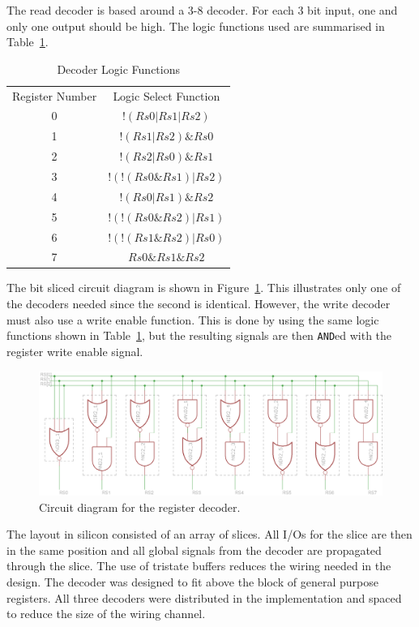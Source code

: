 The read decoder is based around a 3-8 decoder. 
For each 3 bit input, one and only one output should be high. 
The logic functions used are summarised in Table~\ref{tab:reg:decoder}.

\begin{table}
\centering
\begin{tabular}{cc}
Register Number & Logic Select Function \\
0		&		$!( Rs0 | Rs1 | Rs2 )$ \\
1		&		$ !( Rs1 | Rs2 ) \& Rs0$	\\
2		&		$!( Rs2 | Rs0 ) \& Rs1$\\
3		&		$! ( ! ( Rs0 \& Rs1 ) | Rs2 )$	\\
4		&		$!( Rs0 | Rs1 ) \& Rs2$	\\
5		&		$! ( ! ( Rs0 \& Rs2 ) | Rs1 )$	\\
6		&		$! ( ! ( Rs1 \& Rs2 ) | Rs0 )$	\\
7		&		$Rs0 \& Rs1 \& Rs2$	\\
\end{tabular}
\caption{Decoder Logic Functions}
\label{tab:reg:decoder}
\end{table}

The bit sliced circuit diagram is shown in Figure~\ref{fig:reg:decoder}.
This illustrates only one of the decoders needed since the second is identical.
However, the write decoder must also use a write enable function.
This is done by using the same logic functions shown in Table~\ref{tab:reg:decoder}, but the resulting signals are then \texttt{AND}ed with the register write enable signal. 

\begin{figure}
\includegraphics[width=\textwidth]{../../eagle/regBlock/regBlock_decoder.png}
\caption{Circuit diagram for the register decoder.}
\label{fig:reg:decoder}
\end{figure}

The layout in silicon consisted of an array of slices. 
All I/Os for the slice are then in the same position and all global signals from the decoder are propagated through the slice.
The use of tristate buffers reduces the wiring needed in the design. 
The decoder was designed to fit above the block of general purpose registers. 
All three decoders were distributed in the implementation and spaced to reduce the size of the wiring channel.
